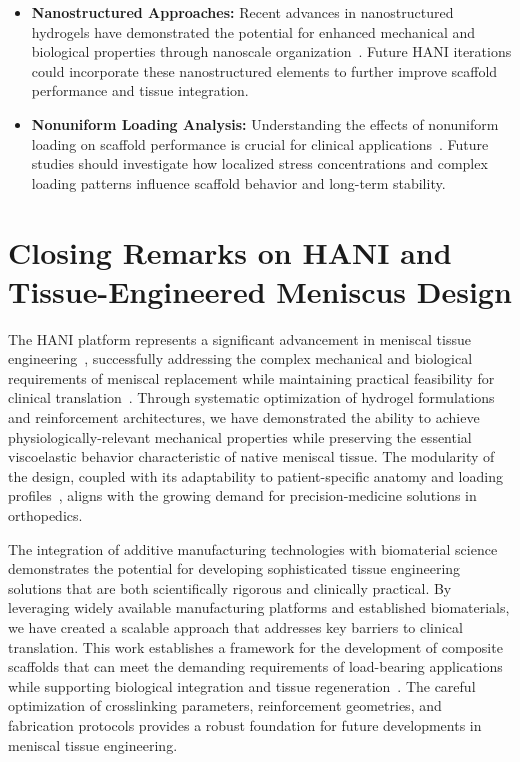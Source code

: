\begin{itemize}
    \item \textbf{Nanostructured Approaches:} Recent advances in nanostructured hydrogels have demonstrated the potential for enhanced mechanical and biological properties through nanoscale organization~\cite{daelemans2018nanostructuredhydrogels}. Future HANI iterations could incorporate these nanostructured elements to further improve scaffold performance and tissue integration.
    
    \item \textbf{Nonuniform Loading Analysis:} Understanding the effects of nonuniform loading on scaffold performance is crucial for clinical applications~\cite{commisso2014effectnonuniform}. Future studies should investigate how localized stress concentrations and complex loading patterns influence scaffold behavior and long-term stability.
\end{itemize}

\newpage
\section{Closing Remarks on HANI and Tissue-Engineered Meniscus Design}

The HANI platform represents a significant advancement in meniscal tissue engineering~\cite{elkommos2025hybridhydrogels}, successfully addressing the complex mechanical and biological requirements of meniscal replacement while maintaining practical feasibility for clinical translation~\cite{gupta2020meniscaltissue}. Through systematic optimization of hydrogel formulations and reinforcement architectures, we have demonstrated the ability to achieve physiologically-relevant mechanical properties while preserving the essential viscoelastic behavior characteristic of native meniscal tissue. The modularity of the design, coupled with its adaptability to patient-specific anatomy and loading profiles~\cite{filardo2019patientspecificmeniscus}, aligns with the growing demand for precision-medicine solutions in orthopedics.

The integration of additive manufacturing technologies with biomaterial science~\cite{ngo2018additivemanufacturing} demonstrates the potential for developing sophisticated tissue engineering solutions that are both scientifically rigorous and clinically practical. By leveraging widely available manufacturing platforms and established biomaterials, we have created a scalable approach that addresses key barriers to clinical translation. This work establishes a framework for the development of composite scaffolds that can meet the demanding requirements of load-bearing applications while supporting biological integration and tissue regeneration~\cite{garreta2017tissueengineering}. The careful optimization of crosslinking parameters, reinforcement geometries, and fabrication protocols provides a robust foundation for future developments in meniscal tissue engineering.

